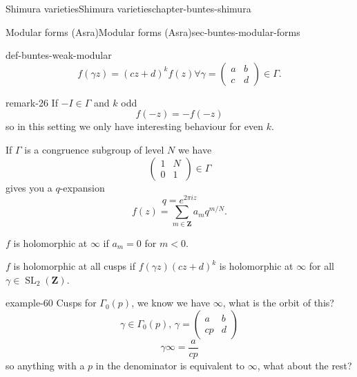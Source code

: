 \documentclass[oneside,10pt,]{book}
\numberwithin{equation}{section}
\newcommand{\ZZ}{\mathbf{Z}}
\DeclareMathOperator{\SL}{SL}
\newcommand{\lt}{<}
\newcommand{\amp}{&}
\begin{document}
\begin{chapterptx}{Shimura varieties}{}{Shimura varieties}{}{}{chapter-buntes-shimura}
\begin{sectionptx}{Modular forms (Asra)}{}{Modular forms (Asra)}{}{}{sec-buntes-modular-forms}
\begin{definition}{}{def-buntes-weak-modular}
\begin{equation*}
f(\gamma z) = (cz+d)^k f(z) \forall \gamma  = \begin{pmatrix} a\amp b \\ c \amp d    \end{pmatrix} \in \Gamma\text{.}
\end{equation*}
%
\end{definition}
\begin{remark}{}{remark-26}%
\hypertarget{p-1054}{}%
If \(-I \in \Gamma\) and \(k\) odd%
\begin{equation*}
f(-z)  = - f(-z)
\end{equation*}
so in this setting we only have interesting behaviour for even \(k\).%
\par
\hypertarget{p-1055}{}%
If \(\Gamma\) is a congruence subgroup of level \(N\) we have%
\begin{equation*}
\begin{pmatrix} 1\amp N \\ 0 \amp 1 \end{pmatrix} \in \Gamma
\end{equation*}
gives you a \(q\)-expansion%
\begin{equation*}
q=  e^{2\pi i z}
\end{equation*}
%
\begin{equation*}
f(z) = \sum_{m\in \ZZ} a_m  q^{m/N}\text{.}
\end{equation*}
%
\par
\hypertarget{p-1056}{}%
\(f\) is holomorphic at \(\infty\) if \(a_m  = 0\) for \(m \lt 0\).%
\par
\hypertarget{p-1057}{}%
\(f\) is holomorphic at all cusps if \(f(\gamma z)(cz+d)^k\) is holomorphic at \(\infty\) for all \(\gamma \in \SL_2(\ZZ)\).%
\end{remark}
\begin{example}{}{example-60}%
\hypertarget{p-1058}{}%
Cusps for \(\Gamma_0(p)\), we know we have \(\infty\), what is the orbit of this?%
\begin{equation*}
\gamma\in \Gamma_0(p),\, \gamma  =  \begin{pmatrix} a\amp b \\ cp \amp d    \end{pmatrix}
\end{equation*}
%
\begin{equation*}
\gamma \infty  = \frac{a}{cp}
\end{equation*}
so anything with  a \(p\) in the denominator is equivalent to \(\infty\), what about the rest?%

\end{example}
\end{sectionptx}
\end{chapterptx}
\end{document}
